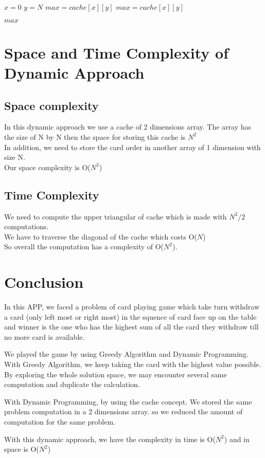 \documentclass{article}
\begin{document}
\begin{algorithm}[H]
\begin{algorithmic}
\caption{}
\State $x = 0$	
\State $y = N$	
\State $max = cache[x][y]$
		\State $max = cache[x][y]$	
	\EndIf
\EndFor

\Return $max$
\EndProcedure
\end{algorithmic}
\end{algorithm}


\section{Space and Time Complexity of Dynamic Approach}
\subsection{Space complexity}
In this dynamic approach we use a cache of 2 dimensions array. The array has the size of N by N then the space for storing this cache is $N^{2}$
\\[0.3cm]
In addition, we need to store the card order in another array of 1 dimension with size N.
\\[0.3cm]
Our space complexity is O($N^{2 }$)

\subsection{Time Complexity}

We need to compute the upper triangular of cache which is made with $N^{2}/2$ computations.
\\[0.3cm]
We have to traverse the diagonal of the cache which costs O($N$)
\\[0.3cm]
So overall the computation has a complexity of O($N^{2}$).


\section{Conclusion}
In this APP, we faced a problem of card playing game which take turn withdraw a card (only left most or right most) in the squence of card face up on the table and winner is the one who has the highest sum of all the card they withdraw till no more card is available.

We played the game by using Greedy Algorithm and Dynamic Programming.
\\[0.5cm]
With Greedy Algorithm, we keep taking the card with the highest value possible. By exploring the whole solution space, we may encounter several same computation and duplicate the calculation.

With Dynamic Programming, by using the cache concept. We stored the same problem computation in a 2 dimensions array. so we reduced the amount of computation for the same problem.

With this dynamic approach, we have the complexity in time is O($N^{2}$) and in space is O($N^{2}$)
\end{document}
